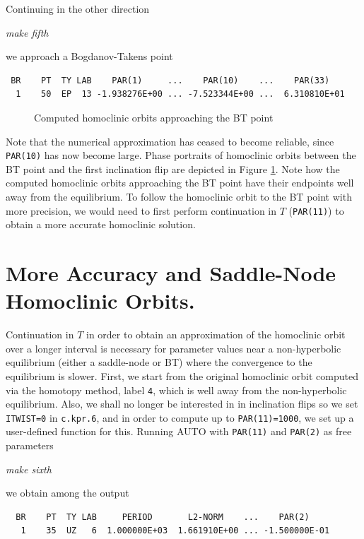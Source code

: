 \documentclass[12pt]{report}
\begin{document}
Continuing in the other direction 
\begin{center}
{\it make fifth}
\end{center}
we approach a Bogdanov-Takens point
\begin{verbatim}  
 BR    PT  TY LAB    PAR(1)     ...    PAR(10)    ...    PAR(33)    
  1    50  EP  13 -1.938276E+00 ... -7.523344E+00 ...  6.310810E+01
\end{verbatim}
\begin{figure}[t]
\epsfysize 9.0cm
\centerline{}
\caption{Computed homoclinic orbits approaching the BT point}
\label{kp.6}
\end{figure}
Note that the numerical approximation has ceased to become reliable, since 
{\tt PAR(10)} has now become large. 
Phase portraits of homoclinic orbits between the BT point and the first
inclination flip 
are depicted in Figure \ref{kp.6}. Note how the computed homoclinic orbits
approaching the BT point have their endpoints well away from the equilibrium.
To follow the homoclinic orbit to 
the BT point with more precision, we would need to first perform continuation 
in $T$ ({\tt PAR(11)}) to obtain a more accurate homoclinic solution.


\section{More Accuracy and Saddle-Node Homoclinic Orbits.}
Continuation in $T$ 
in order to obtain an approximation of the homoclinic orbit over a
longer interval is necessary for parameter values near a non-hyperbolic
equilibrium (either a saddle-node or BT) where the convergence
to the equilibrium is slower. 
First, we start from the original homoclinic orbit computed
via the homotopy method, label {\tt 4}, which is well away from
the non-hyperbolic equilibrium.
Also, we shall no longer be interested in
in inclination flips so we set {\tt ITWIST=0} in {\tt c.kpr.6},
and in order to compute up to {\tt PAR(11)=1000}, we set up a
user-defined function for this. Running {\cal AUTO} with {\tt PAR(11)} and 
{\tt PAR(2)} as free parameters
\begin{center}
{\it make sixth}
\end{center}
we obtain among the output
\begin{verbatim}
  BR    PT  TY LAB     PERIOD       L2-NORM    ...    PAR(2)     
   1    35  UZ   6  1.000000E+03  1.661910E+00 ... -1.500000E-01
\end{verbatim}
\end{document}
